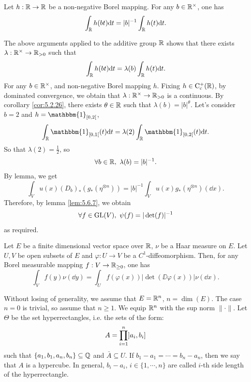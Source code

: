 \begin{lemmaenv}
    Let $h : \mathbb{R} \rightarrow \mathbb{R}$ be a non-negative Borel mapping.
    For any $b \in \mathbb{R}^\times$, one has
    $$\int_{\mathbb{R}} h(bt) \mathrm{d} t = |b|^{-1} \int_{\mathbb{R}} h(t) \mathrm{d} t.$$
\end{lemmaenv}
\begin{proofenv}
    The above arguments applied to the additive group $\mathbb{R}$ shows that there exists $\lambda : \mathbb{R}^\times \rightarrow \mathbb{R}_{>0}$ such that
    $$\int_{\mathbb{R}} h(bt) \mathrm{d} t = \lambda(b) \int_{\mathbb{R}} h(t) \mathrm{d} t.$$
    For any $b \in \mathbb{R}^\times$, and non-negative Borel mapping $h$.
    Fixing $h \in \operatorname{C_{c}^{+}}(\mathbb{R})$, by dominated convergence,
    we obtain that $\lambda : \mathbb{R}^\times \rightarrow \mathbb{R}_{>0}$ is a continuous.
    By corollary \ref{cor:5.2.26}, there exists $\theta \in \mathbb{R}$ such that $\lambda(b) = |b|^{\theta}$.
    Let's consider $b = 2$ and $h = \mathbbm{1}_{\interval[open right]{0}{2}}$,
    $$\int_{\RR} \mathbbm{1}_{\interval[open right]{0}{1}}(t) \dd t = \lambda(2) \int_{\RR} \mathbbm{1}_{\interval[open right]{0}{2}}(t) \dd t.$$
    So that $\lambda(2) = \frac{1}{2}$, so
    $$\forall b \in \mathbb{R},\ \lambda(b) = |b|^{-1}.$$
    By lemma, we get
    $$\int_{V} u(x) (D_b)_*(g_*(\eta^{\otimes n})) = |b|^{-1} \int_{V} u(x) g_{*} (\eta^{\otimes n})(\dd x).$$
    Therefore, by lemma \ref{lem:5.6.7}, we obtain
    $$\forall f \in \operatorname{\mathrm{GL}}(V),\ \psi(f) = |\det(f)|^{-1}$$
    as required.
\end{proofenv}

\begin{theoremenv}
    Let $E$ be a finite dimensional vector space over $\mathbb{R}$,
    $\nu$ be a Haar measure on $E$.
    Let $U,V$ be open subsets of $E$ and $\varphi : U \rightarrow V$ be a $C^1$-diffeomorphism.
    Then, for any Borel measurable mapping $f : V \rightarrow \mathbb{R}_{\ge 0}$,
    one has
    $$\int_{V} f(y) \nu(\dd y) = \int_{U} f(\varphi(x)) |\det(\DD \varphi(x))| \nu(\dd x).$$
\end{theoremenv}
\begin{proofenv}
    Without losing of generality, we assume that $E = \mathbb{R}^n$, $n = \dim(E)$.
    The case $n = 0$ is trivial, so assume that $n \ge 1$.
    We equip $\mathbb{R}^n$ with the sup norm $\|\cdot\|$.
    Let $\Theta$ be the set hyperrectangles, i.e. the sets of the form:
    $$A = \prod_{i=1}^n \interval[open left]{a_i}{b_i}$$
    such that $\{a_1,b_1,a_n,b_n\} \subseteq \mathbb{Q}$ and $\bar{A} \subseteq U$.
    If $b_1 - a_1 = \cdots = b_n - a_n$, then we say that $A$ is a hypercube.
    In general, $b_i - a_i$, $i \in \{1,\cdots,n\}$ are called $i$-th side length of the hyperrectangle.
\end{proofenv}

